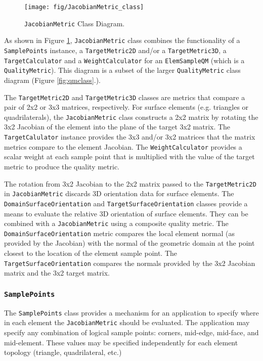 \documentclass{article}
\begin{document}
\begin{figure}[htb]
\begin{center}
\texttt{[image: fig/JacobianMetric\_class]}
\caption{\texttt{JacobianMetric} Class Diagram.\label{fig:JacobianMetric}}
\end{center}
\end{figure}

As shown in Figure \ref{fig:JacobianMetric}, \texttt{JacobianMetric} class combines the functionality of a \texttt{SamplePoints} instance, a \texttt{TargetMetric2D} and/or a \texttt{TargetMetric3D}, a \texttt{TargetCalculator} and a \texttt{WeightCalculator} for an \texttt{ElemSampleQM} (which is a \texttt{QualityMetric}).  This diagram is a subset of the larger \texttt{QualityMetric} class diagram (Figure \ref{fig:qmclass}.).  

The \texttt{TargetMetric2D} and \texttt{TargetMetric3D} classes are metrics that compare a pair of 2x2 or 3x3 matrices, respectively.  For surface elements (e.g. triangles or quadrilaterals), the \texttt{JacobianMetric} class constructs a 2x2 matrix by rotating the 3x2 Jacobian of the element into the plane of the target 3x2 matrix.  The \texttt{TargetCalulator} instance provides the 3x3 and/or 3x2 matrices that the matrix metrics compare to the element Jacobian.  The \texttt{WeightCalculator} provides a scalar weight at each sample point that is multiplied with the value of the target metric to produce the quality metric.

The rotation from 3x2 Jacobian to the 2x2 matrix passed to the \texttt{TargetMetric2D} in \texttt{JacobianMetric} discards 3D orientation data for surface elements.  The \texttt{DomainSurfaceOrientation} and \texttt{TargetSurfaceOrientation} classes provide a means to evaluate the relative 3D orientation of surface elements.  They can be combined with a \texttt{JacobianMetric} using a composite quality metric.  The \texttt{DomainSurfaceOrientation} metric compares the local element normal (as provided by the Jacobian) with the normal of the geometric domain at the point closest to the location of the element sample point.  The \texttt{TargetSurfaceOrientation} compares the normals provided by the 3x2 Jacobian matrix and the 3x2 target matrix.

\subsubsection{\texttt{SamplePoints}}
The \texttt{SamplePoints} class provides a mechanism for an application to specify where in each element the \texttt{JacobianMetric} should be evaluated.  The application may specify any combination of logical sample points: corners, mid-edge, mid-face, and mid-element.  These values may be specified independently for each element topology (triangle, quadrilateral, etc.)  
\end{document}
